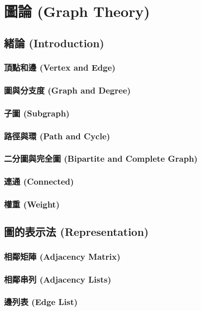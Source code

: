 \chapter{圖論 (Graph Theory)}

\section{緒論 (Introduction)}
\subsection{頂點和邊 (Vertex and Edge)}
\subsection{圖與分支度 (Graph and Degree)}
\subsection{子圖 (Subgraph)}
\subsection{路徑與環 (Path and Cycle)}
\subsection{二分圖與完全圖 (Bipartite and Complete Graph)}
\subsection{連通 (Connected)}
\subsection{權重 (Weight)}

\section{圖的表示法 (Representation)}
\subsection{相鄰矩陣 (Adjacency Matrix)}
\subsection{相鄰串列 (Adjacency Lists)}
\subsection{邊列表 (Edge List)}
